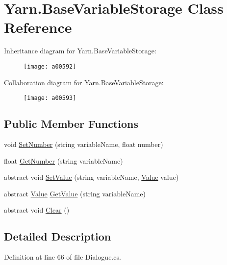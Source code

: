 \hypertarget{a00032}{\section{Yarn.\-Base\-Variable\-Storage Class Reference}
\label{a00032}
}


Inheritance diagram for Yarn.\-Base\-Variable\-Storage\-:
\nopagebreak
\begin{figure}[H]
\begin{center}
\leavevmode
\texttt{[image: a00592]}
\end{center}
\end{figure}


Collaboration diagram for Yarn.\-Base\-Variable\-Storage\-:
\nopagebreak
\begin{figure}[H]
\begin{center}
\leavevmode
\texttt{[image: a00593]}
\end{center}
\end{figure}
\subsection*{Public Member Functions}
\begin{DoxyCompactItemize}
\item 
void \hyperlink{a00032_a48b93de9cd7ae61d0cd9583c8330d3ee}{Set\-Number} (string variable\-Name, float number)
\item 
float \hyperlink{a00032_a1b7f7f4468b2463e7b47986d99362279}{Get\-Number} (string variable\-Name)
\item 
abstract void \hyperlink{a00032_a1c57d6d208b78abec0a670396771448e}{Set\-Value} (string variable\-Name, \hyperlink{a00177}{Value} value)
\item 
abstract \hyperlink{a00177}{Value} \hyperlink{a00032_a13b142df804d9842e97e628e252928e8}{Get\-Value} (string variable\-Name)
\item 
abstract void \hyperlink{a00032_a7e45c37f3662ce9f2643e306bb2b3adc}{Clear} ()
\end{DoxyCompactItemize}


\subsection{Detailed Description}


Definition at line 66 of file Dialogue.\-cs.



